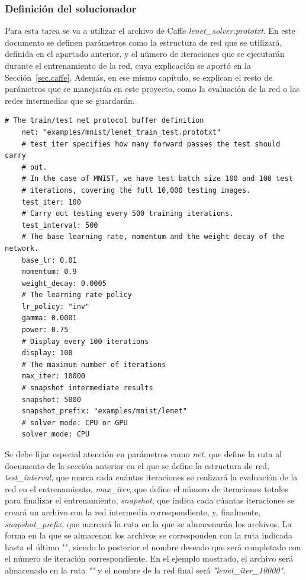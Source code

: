 \subsubsection{Definición del solucionador}
	Para esta tarea se va a utilizar el archivo de Caffe \textit{lenet\_solver.prototxt}. En este documento se definen parámetros como la estructura de red que se utilizará, definida en el apartado anterior, y el número de iteraciones que se ejecutarán durante el entrenamiento de la red, cuya explicación se aportó en la Sección~\ref{sec.caffe}. Además, en ese mismo capítulo, se explican el resto de parámetros que se manejarán en este proyecto, como la evaluación de la red o las redes intermedias que se guardarán.
	\vspace{10pt}
	\begin{lstlisting}[frame=single]
	# The train/test net protocol buffer definition
	net: "examples/mnist/lenet_train_test.prototxt"
	# test_iter specifies how many forward passes the test should carry 
	# out.
	# In the case of MNIST, we have test batch size 100 and 100 test
	# iterations, covering the full 10,000 testing images.
	test_iter: 100
	# Carry out testing every 500 training iterations.
	test_interval: 500
	# The base learning rate, momentum and the weight decay of the network.
	base_lr: 0.01
	momentum: 0.9
	weight_decay: 0.0005
	# The learning rate policy
	lr_policy: "inv"
	gamma: 0.0001
	power: 0.75
	# Display every 100 iterations
	display: 100
	# The maximum number of iterations
	max_iter: 10000
	# snapshot intermediate results
	snapshot: 5000
	snapshot_prefix: "examples/mnist/lenet"
	# solver mode: CPU or GPU
	solver_mode: CPU	
	\end{lstlisting}
	
	Se debe fijar especial atención en parámetros como \textit{net}, que define la ruta al documento de la sección anterior en el que se define la estructura de red, \textit{test\_interval}, que marca cada cuántas iteraciones se realizará la evaluación de la red en el entrenamiento, \textit{max\_iter}, que define el número de iteraciones totales para finalizar el entrenamiento, \textit{snapshot}, que indica cada cúantas iteraciones se creará un archivo con la red intermedia correspondiente, y, finalmente, \textit{snapshot\_prefix}, que marcará la ruta en la que se almacenarán los archivos. La forma en la que se almacenan los archivos se corresponden con la ruta indicada hasta el último "\text{/}", siendo lo posterior el nombre deseado que será completado con el número de iteración correspondiente. En el ejemplo mostrado, el archivo será almacenado en la ruta \textit{""}    y el nombre de la red final será \textit{"lenet\_iter\_10000"}.\\
	

